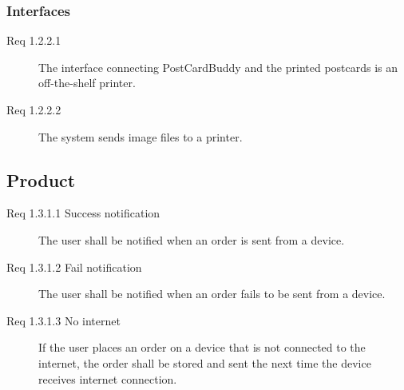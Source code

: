 \documentclass[10pt,a4paper]{article}
\begin{document}
\subsubsection{Interfaces}
\begin {description}
\item [Req 1.2.2.1] The interface connecting PostCardBuddy and the printed postcards is an off-the-shelf printer.
\item [Req 1.2.2.2] The system sends image files to a printer. 
\end{description}
\subsection{Product}
\begin{description}
\item [Req 1.3.1.1 Success notification] The user shall be notified when an order is sent from a device.
\item [Req 1.3.1.2 Fail notification] The user shall be notified when an order fails to be sent from a device.

\item [Req 1.3.1.3 No internet] If the user places an order on a device that is not connected to the internet, the order shall be stored and sent the next time the device receives internet connection. 

\end{description}
\end{document}
